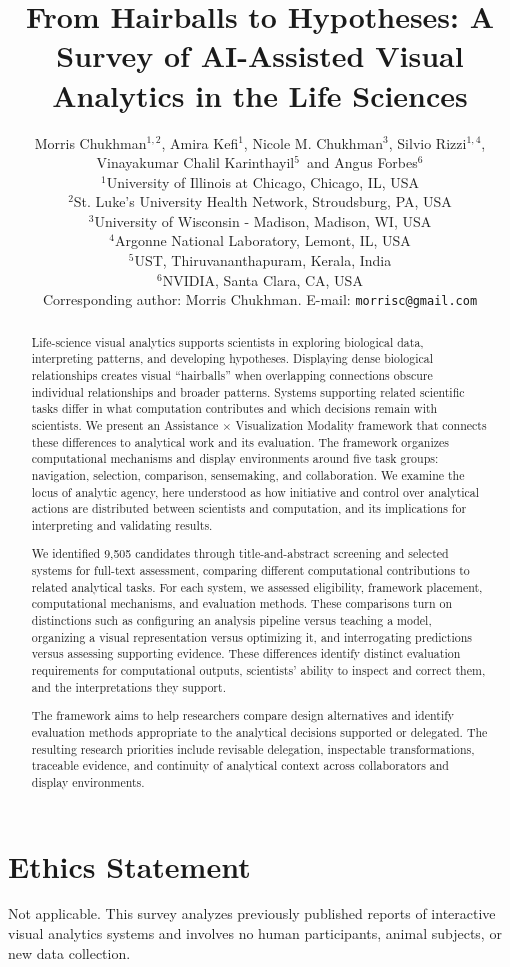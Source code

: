\documentclass{egpubl}
\title[From Hairballs to Hypotheses]{From Hairballs to Hypotheses: A Survey of AI-Assisted Visual Analytics in the Life Sciences}
\author[Chukhman et al.]
{\parbox{\textwidth}{\centering
Morris Chukhman$^{1,2}$,
Amira Kefi$^{1}$,
Nicole M. Chukhman$^{3}$,
Silvio Rizzi$^{1,4}$,
Vinayakumar Chalil Karinthayil$^{5}$\,
and Angus Forbes$^{6}$\\[1ex]
{\small
$^{1}$University of Illinois at Chicago, Chicago, IL, USA\\
$^{2}$St. Luke's University Health Network, Stroudsburg, PA, USA \\
$^{3}$University of Wisconsin - Madison, Madison, WI, USA \\
$^{4}$Argonne National Laboratory, Lemont, IL, USA \\
$^{5}$UST, Thiruvananthapuram, Kerala, India \\
$^{6}$NVIDIA, Santa Clara, CA, USA \\[1ex]
Corresponding author: Morris Chukhman. E-mail: \texttt{morrisc@gmail.com}\\
}
}
}
\begin{document}
\maketitle
\begin{abstract}
Life-science visual analytics supports scientists in exploring biological data, interpreting patterns, and developing hypotheses. Displaying dense biological relationships creates visual ``hairballs'' when overlapping connections obscure individual relationships and broader patterns. Systems supporting related scientific tasks differ in what computation contributes and which decisions remain with scientists. We present an Assistance $\times$ Visualization Modality framework that connects these differences to analytical work and its evaluation. The framework organizes computational mechanisms and display environments around five task groups: navigation, selection, comparison, sensemaking, and collaboration. We examine the locus of analytic agency, here understood as how initiative and control over analytical actions are distributed between scientists and computation, and its implications for interpreting and validating results.

We identified 9,505 candidates through title-and-abstract screening and selected systems for full-text assessment, comparing different computational contributions to related analytical tasks. For each system, we assessed eligibility, framework placement, computational mechanisms, and evaluation methods. These comparisons turn on distinctions such as configuring an analysis pipeline versus teaching a model, organizing a visual representation versus optimizing it, and interrogating predictions versus assessing supporting evidence. These differences identify distinct evaluation requirements for computational outputs, scientists' ability to inspect and correct them, and the interpretations they support.

The framework aims to help researchers compare design alternatives and identify evaluation methods appropriate to the analytical decisions supported or delegated. The resulting research priorities include revisable delegation, inspectable transformations, traceable evidence, and continuity of analytical context across collaborators and display environments.

\end{abstract}









\section*{Ethics Statement}
Not applicable. This survey analyzes previously published reports of interactive visual analytics systems and involves no human participants, animal subjects, or new data collection.
\label{main-text-end}
\clearpage


\end{document}
